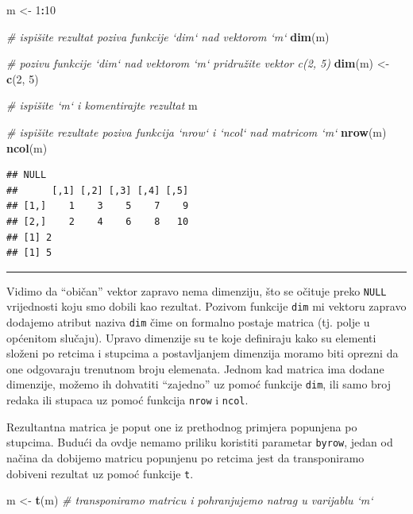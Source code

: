 \documentclass[]{book}
\newenvironment{Shaded}{\begin{snugshade}}{\end{snugshade}}
\newcommand{\KeywordTok}[1]{\textcolor[rgb]{0.13,0.29,0.53}{\textbf{#1}}}
\newcommand{\DecValTok}[1]{\textcolor[rgb]{0.00,0.00,0.81}{#1}}
\newcommand{\StringTok}[1]{\textcolor[rgb]{0.31,0.60,0.02}{#1}}
\newcommand{\CommentTok}[1]{\textcolor[rgb]{0.56,0.35,0.01}{\textit{#1}}}
\newcommand{\OperatorTok}[1]{\textcolor[rgb]{0.81,0.36,0.00}{\textbf{#1}}}
\newcommand{\NormalTok}[1]{#1}
\theoremstyle{definition}
\theoremstyle{definition}
\theoremstyle{definition}
\theoremstyle{remark}
\begin{document}
\begin{Shaded}
\begin{Highlighting}[]
\NormalTok{m <-}\StringTok{ }\DecValTok{1}\OperatorTok{:}\DecValTok{10}

\CommentTok{# ispišite rezultat poziva funkcije `dim` nad vektorom `m`}
\KeywordTok{dim}\NormalTok{(m)}

\CommentTok{# pozivu funkcije `dim` nad vektorom `m` pridružite vektor c(2, 5)}
\KeywordTok{dim}\NormalTok{(m) <-}\StringTok{ }\KeywordTok{c}\NormalTok{(}\DecValTok{2}\NormalTok{, }\DecValTok{5}\NormalTok{)}

\CommentTok{# ispišite `m` i komentirajte rezultat}
\NormalTok{m}

\CommentTok{# ispišite rezultate poziva funkcija `nrow` i `ncol` nad matricom `m`}
\KeywordTok{nrow}\NormalTok{(m)}
\KeywordTok{ncol}\NormalTok{(m)}
\end{Highlighting}
\end{Shaded}

\begin{verbatim}
## NULL
##      [,1] [,2] [,3] [,4] [,5]
## [1,]    1    3    5    7    9
## [2,]    2    4    6    8   10
## [1] 2
## [1] 5
\end{verbatim}

\begin{center}\rule{0.5\linewidth}{\linethickness}\end{center}

Vidimo da ``običan'' vektor zapravo nema dimenziju, što se očituje preko
\texttt{NULL} vrijednosti koju smo dobili kao rezultat. Pozivom funkcije
\texttt{dim} mi vektoru zapravo dodajemo atribut naziva \texttt{dim}
čime on formalno postaje matrica (tj. polje u općenitom slučaju). Upravo
dimenzije su te koje definiraju kako su elementi složeni po retcima i
stupcima a postavljanjem dimenzija moramo biti oprezni da one odgovaraju
trenutnom broju elemenata. Jednom kad matrica ima dodane dimenzije,
možemo ih dohvatiti ``zajedno'' uz pomoć funkcije \texttt{dim}, ili samo
broj redaka ili stupaca uz pomoć funkcija \texttt{nrow} i \texttt{ncol}.

Rezultantna matrica je poput one iz prethodnog primjera popunjena po
stupcima. Budući da ovdje nemamo priliku koristiti parametar
\texttt{byrow}, jedan od načina da dobijemo matricu popunjenu po retcima
jest da transponiramo dobiveni rezultat uz pomoć funkcije \texttt{t}.

\begin{Shaded}
\begin{Highlighting}[]
\NormalTok{m <-}\StringTok{ }\KeywordTok{t}\NormalTok{(m)  }\CommentTok{# transponiramo matricu i pohranjujemo natrag u varijablu `m`}
\end{Highlighting}
\end{Shaded}
\end{document}
